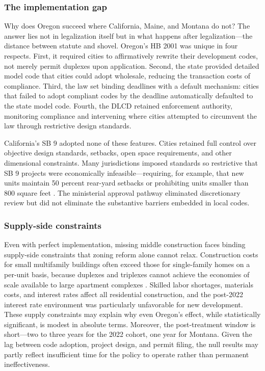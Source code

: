 \documentclass[12pt]{article}
\begin{document}
\subsubsection*{The implementation gap} Why does Oregon succeed where California, Maine, and Montana do not? The answer lies not in legalization itself but in what happens after legalization---the distance between statute and shovel. Oregon's HB 2001 was unique in four respects. First, it required cities to affirmatively rewrite their development codes, not merely permit duplexes upon application. Second, the state provided detailed model code that cities could adopt wholesale, reducing the transaction costs of compliance. Third, the law set binding deadlines with a default mechanism: cities that failed to adopt compliant codes by the deadline automatically defaulted to the state model code. Fourth, the DLCD retained enforcement authority, monitoring compliance and intervening where cities attempted to circumvent the law through restrictive design standards.

California's SB 9 adopted none of these features. Cities retained full control over objective design standards, setbacks, open space requirements, and other dimensional constraints. Many jurisdictions imposed standards so restrictive that SB 9 projects were economically infeasible---requiring, for example, that new units maintain 50 percent rear-yard setbacks or prohibiting units smaller than 800 square feet \citep{Murray2022}. The ministerial approval pathway eliminated discretionary review but did not eliminate the substantive barriers embedded in local codes.

\subsubsection*{Supply-side constraints} Even with perfect implementation, missing middle construction faces binding supply-side constraints that zoning reform alone cannot relax. Construction costs for small multifamily buildings often exceed those for single-family homes on a per-unit basis, because duplexes and triplexes cannot achieve the economies of scale available to large apartment complexes \citep{glaesergyourko2018}. Skilled labor shortages, materials costs, and interest rates affect all residential construction, and the post-2022 interest rate environment was particularly unfavorable for new development. These supply constraints may explain why even Oregon's effect, while statistically significant, is modest in absolute terms. Moreover, the post-treatment window is short---two to three years for the 2022 cohort, one year for Montana. Given the lag between code adoption, project design, and permit filing, the null results may partly reflect insufficient time for the policy to operate rather than permanent ineffectiveness.
\end{document}
